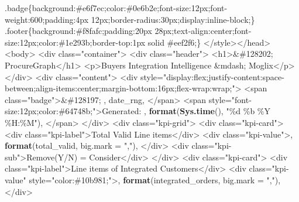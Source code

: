 \documentclass[
]{article}
\newenvironment{Shaded}{\begin{snugshade}}{\end{snugshade}}
\newcommand{\AttributeTok}[1]{\textcolor[rgb]{0.13,0.29,0.53}{#1}}
\newcommand{\FunctionTok}[1]{\textcolor[rgb]{0.13,0.29,0.53}{\textbf{#1}}}
\newcommand{\NormalTok}[1]{#1}
\newcommand{\StringTok}[1]{\textcolor[rgb]{0.31,0.60,0.02}{#1}}
\begin{document}
\begin{Shaded}
\begin{Highlighting}[]
\StringTok{  .badge\{background:\#e6f7ec;color:\#0e6b2e;font{-}size:12px;font{-}weight:600;padding:4px 12px;border{-}radius:30px;display:inline{-}block;\}}
\StringTok{  .footer\{background:\#f8fafc;padding:20px 28px;text{-}align:center;font{-}size:12px;color:\#1e293b;border{-}top:1px solid \#eef2f6;\}}
\StringTok{\textless{}/style\textgreater{}\textless{}/head\textgreater{}\textless{}body\textgreater{}}
\StringTok{\textless{}div class="container"\textgreater{}}
\StringTok{  \textless{}div class="header"\textgreater{}}
\StringTok{    \textless{}h1\textgreater{}\&\#128202; ProcureGraph\textless{}/h1\textgreater{}}
\StringTok{    \textless{}p\textgreater{}Buyers Integration Intelligence \&mdash; Moglix\textless{}/p\textgreater{}}
\StringTok{  \textless{}/div\textgreater{}}
\StringTok{  \textless{}div class="content"\textgreater{}}
\StringTok{    \textless{}div style="display:flex;justify{-}content:space{-}between;align{-}items:center;margin{-}bottom:16px;flex{-}wrap:wrap;"\textgreater{}}
\StringTok{      \textless{}span class="badge"\textgreater{}\&\#128197; \textquotesingle{}}\NormalTok{, date\_rng, }\StringTok{\textquotesingle{}\textless{}/span\textgreater{}}
\StringTok{      \textless{}span style="font{-}size:12px;color:\#64748b;"\textgreater{}Generated: \textquotesingle{}}\NormalTok{, }\FunctionTok{format}\NormalTok{(}\FunctionTok{Sys.time}\NormalTok{(), }\StringTok{"\%d \%b \%Y \%H:\%M"}\NormalTok{), }\StringTok{\textquotesingle{}\textless{}/span\textgreater{}}
\StringTok{    \textless{}/div\textgreater{}}
\StringTok{    \textless{}div class="kpi{-}grid"\textgreater{}}
\StringTok{      \textless{}div class="kpi{-}card"\textgreater{}}
\StringTok{        \textless{}div class="kpi{-}label"\textgreater{}Total Valid Line items\textless{}/div\textgreater{}}
\StringTok{        \textless{}div class="kpi{-}value"\textgreater{}\textquotesingle{}}\NormalTok{, }\FunctionTok{format}\NormalTok{(total\_valid, }\AttributeTok{big.mark =} \StringTok{","}\NormalTok{), }\StringTok{\textquotesingle{}\textless{}/div\textgreater{}}
\StringTok{        \textless{}div class="kpi{-}sub"\textgreater{}Remove(Y/N) = Consider\textless{}/div\textgreater{}}
\StringTok{      \textless{}/div\textgreater{}}
\StringTok{      \textless{}div class="kpi{-}card"\textgreater{}}
\StringTok{        \textless{}div class="kpi{-}label"\textgreater{}Line items of Integrated Customers\textless{}/div\textgreater{}}
\StringTok{        \textless{}div class="kpi{-}value" style="color:\#10b981;"\textgreater{}\textquotesingle{}}\NormalTok{, }\FunctionTok{format}\NormalTok{(integrated\_orders, }\AttributeTok{big.mark =} \StringTok{","}\NormalTok{), }\StringTok{\textquotesingle{}\textless{}/div\textgreater{}}

\end{Highlighting}
\end{Shaded}
\end{document}
